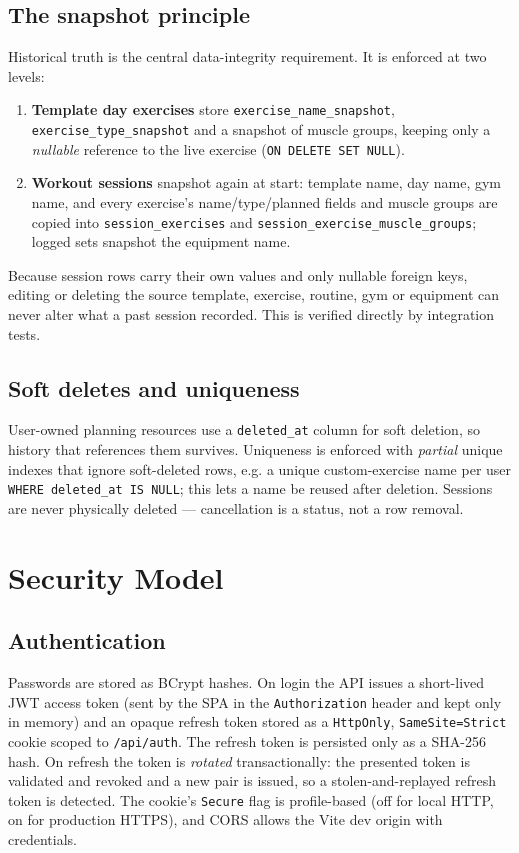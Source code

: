 \documentclass[11pt,a4paper]{article}
\begin{document}
\subsection{The snapshot principle}
\label{sec:snapshots}
Historical truth is the central data-integrity requirement. It is enforced at two levels:
\begin{enumerate}[noitemsep]
  \item \textbf{Template day exercises} store \verb|exercise_name_snapshot|,
        \verb|exercise_type_snapshot| and a snapshot of muscle groups, keeping only a
        \emph{nullable} reference to the live exercise (\verb|ON DELETE SET NULL|).
  \item \textbf{Workout sessions} snapshot again at start: template name, day name, gym name, and
        every exercise's name/type/planned fields and muscle groups are copied into
        \verb|session_exercises| and \verb|session_exercise_muscle_groups|; logged sets snapshot
        the equipment name.
\end{enumerate}
Because session rows carry their own values and only nullable foreign keys, editing or deleting
the source template, exercise, routine, gym or equipment can never alter what a past session
recorded. This is verified directly by integration tests.

\subsection{Soft deletes and uniqueness}
User-owned planning resources use a \verb|deleted_at| column for soft deletion, so history that
references them survives. Uniqueness is enforced with \emph{partial} unique indexes that ignore
soft-deleted rows, e.g. a unique custom-exercise name per user
\verb|WHERE deleted_at IS NULL|; this lets a name be reused after deletion. Sessions are never
physically deleted --- cancellation is a status, not a row removal.

\section{Security Model}

\subsection{Authentication}
Passwords are stored as BCrypt hashes. On login the API issues a short-lived JWT access token
(sent by the SPA in the \verb|Authorization| header and kept only in memory) and an opaque refresh
token stored as a \verb|HttpOnly|, \verb|SameSite=Strict| cookie scoped to \verb|/api/auth|. The
refresh token is persisted only as a SHA-256 hash. On refresh the token is \emph{rotated}
transactionally: the presented token is validated and revoked and a new pair is issued, so a
stolen-and-replayed refresh token is detected. The cookie's \verb|Secure| flag is profile-based
(off for local HTTP, on for production HTTPS), and CORS allows the Vite dev origin with
credentials.
\end{document}
